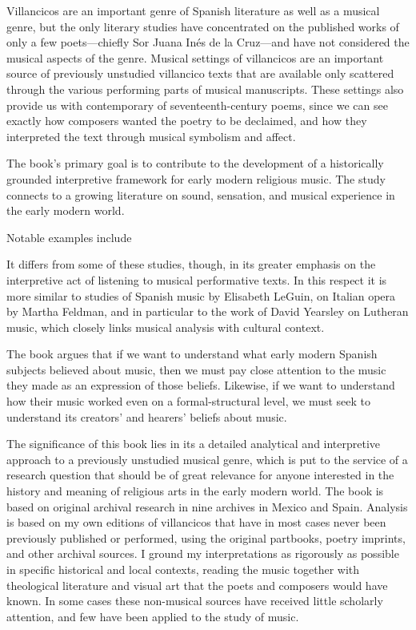 \documentclass{vcbook-proposal}
\begin{document}
Villancicos are an important genre of Spanish literature as well as a musical genre, but the only literary studies have concentrated on the published works of only a few poets---chiefly Sor Juana Inés de la Cruz---and have not considered the musical aspects of the genre.%
  \autocite{Tenorio:SorJuana}
Musical settings of villancicos are an important source of previously unstudied villancico texts that are available only scattered through the various performing parts of musical manuscripts.
These settings also provide us with contemporary  of seventeenth-century poems, since we can see exactly how composers wanted the poetry to be declaimed, and how they interpreted the text through musical symbolism and affect.

The book's primary goal is to contribute to the development of a historically grounded interpretive framework for early modern religious music.
The study connects to a growing literature on sound, sensation, and musical experience in the early modern world.%
  \begin{Footnote}
  Notable examples include \autocites{Rath:EarlyAmerica}{Feldman:Passions}
  {Austern:Nature}{Gouk:MusicScienceMagic}
  \end{Footnote}
It differs from some of these studies, though, in its greater emphasis on the interpretive act of listening to musical performative texts.
In this respect it is more similar to studies of Spanish music by Elisabeth LeGuin, on Italian opera by Martha Feldman, and in particular to the work of David Yearsley on Lutheran music, which closely links musical analysis with cultural context.%
  \autocites{LeGuin:Tonadilla}{LeGuin:BoccheriniBody}
  {Feldman:Opera}{Yearsley:BachCounterpoint}

The book argues that if we want to understand what early modern Spanish subjects believed about music, then we must pay close attention to the music they made as an expression of those beliefs.
Likewise, if we want to understand how their music worked even on a formal-structural level, we must seek to understand its creators' and hearers' beliefs about music.

The significance of this book lies in its a detailed analytical and interpretive approach to a previously unstudied musical genre, which is put to the service of a research question that should be of great relevance for anyone interested in the history and meaning of religious arts in the early modern world.
The book is based on original archival research in nine archives in Mexico and Spain.
Analysis is based on my own editions of villancicos that have in most cases never been previously published or performed, using the original partbooks, poetry imprints, and other archival sources.
I ground my interpretations as rigorously as possible in specific historical and local contexts, reading the music together with theological literature and visual art that the poets and composers would have known.
In some cases these non-musical sources have received little scholarly attention, and few have been applied to the study of music.
\end{document}
